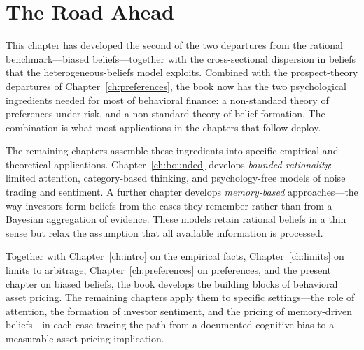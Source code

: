 \section{The Road Ahead}
\label{sec:beliefsahead}

This chapter has developed the second of the two departures from the rational benchmark---biased beliefs---together with the cross-sectional dispersion in beliefs that the heterogeneous-beliefs model exploits. Combined with the prospect-theory departures of Chapter~\ref{ch:preferences}, the book now has the two psychological ingredients needed for most of behavioral finance: a non-standard theory of preferences under risk, and a non-standard theory of belief formation. The combination is what most applications in the chapters that follow deploy.

The remaining chapters assemble these ingredients into specific empirical and theoretical applications. Chapter~\ref{ch:bounded} develops \emph{bounded rationality}: limited attention, category-based thinking, and psychology-free models of noise trading and sentiment. A further chapter develops \emph{memory-based} approaches---the way investors form beliefs from the cases they remember rather than from a Bayesian aggregation of evidence. These models retain rational beliefs in a thin sense but relax the assumption that all available information is processed.

Together with Chapter~\ref{ch:intro} on the empirical facts, Chapter~\ref{ch:limits} on limits to arbitrage, Chapter~\ref{ch:preferences} on preferences, and the present chapter on biased beliefs, the book develops the building blocks of behavioral asset pricing. The remaining chapters apply them to specific settings---the role of attention, the formation of investor sentiment, and the pricing of memory-driven beliefs---in each case tracing the path from a documented cognitive bias to a measurable asset-pricing implication.
